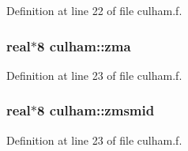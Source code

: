 Definition at line 22 of file culham.f.\hypertarget{namespaceculham_7be4069ba1270e1795cc36ebd2dc0a70}{
\subsubsection[zma]{\setlength{\rightskip}{0pt plus 5cm}real$\ast$8 {\bf culham::zma}}}
\label{namespaceculham_7be4069ba1270e1795cc36ebd2dc0a70}




Definition at line 23 of file culham.f.\hypertarget{namespaceculham_1fb71c104f13bac55811277b4fecdb55}{
\subsubsection[zmsmid]{\setlength{\rightskip}{0pt plus 5cm}real$\ast$8 {\bf culham::zmsmid}}}
\label{namespaceculham_1fb71c104f13bac55811277b4fecdb55}




Definition at line 23 of file culham.f.